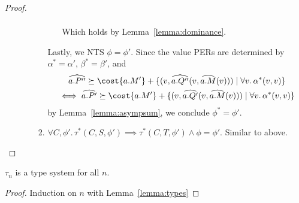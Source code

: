 \begin{proof}
\begin{enumerate}
\begin{itemize}
\begin{enumerate}
\begin{itemize}
\begin{gather*}
          \end{gather*}
          Which holds by Lemma~\ref{lemma:dominance}.
      \end{itemize}
      Lastly, we NTS $\phi = \phi'$. Since the value PERs are determined by $\alpha^* = \alpha'$, $\beta^* = \beta'$, 
      and 
          \begin{gather*}
            \widehat{a.P''} \succeq \cost{a.M'} + \{(v, \widehat{a.Q''}(v,\widehat{a.M}(v))) \mid \forall v.\, \alpha^*(v,v)\}\\
          \iff \widehat{a.P'} \succeq \cost{a.M'} + \{(v, \widehat{a.Q'}(v,\widehat{a.M}(v))) \mid \forall v.\, \alpha^*(v,v)\} 
          \end{gather*}
          by Lemma~\ref{lemma:asympsum},
      we conclude $\phi^* = \phi'$.
  \item $\forall C,\phi'.\, \tau^*(C,S,\phi') \implies \tau^*(C,T,\phi') \land \phi = \phi'$. Similar to above.
  \end{enumerate}

\end{itemize}
\end{enumerate}
\end{proof}


\begin{lemma}
$\tau_n$ is a type system for all $n$.
\end{lemma}

\begin{proof}
  Induction on $n$ with Lemma~\ref{lemma:types}
\end{proof}
